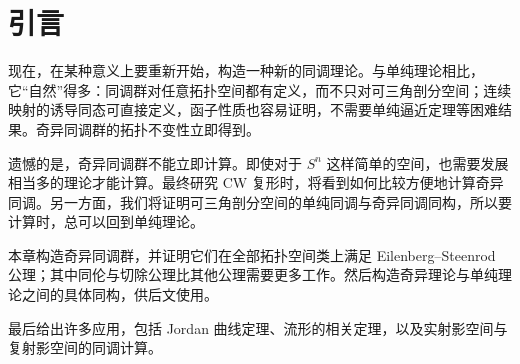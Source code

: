 \section{引言}
现在，在某种意义上要重新开始，构造一种新的同调理论。与单纯理论相比，它“自然”得多：同调群对任意拓扑空间都有定义，而不只对可三角剖分空间；连续映射的诱导同态可直接定义，函子性质也容易证明，不需要单纯逼近定理等困难结果。奇异同调群的拓扑不变性立即得到。

遗憾的是，奇异同调群不能立即计算。即使对于 $S^n$ 这样简单的空间，也需要发展相当多的理论才能计算。最终研究 CW 复形时，将看到如何比较方便地计算奇异同调。另一方面，我们将证明可三角剖分空间的单纯同调与奇异同调同构，所以要计算时，总可以回到单纯理论。

本章构造奇异同调群，并证明它们在全部拓扑空间类上满足 Eilenberg--Steenrod 公理；其中同伦与切除公理比其他公理需要更多工作。然后构造奇异理论与单纯理论之间的具体同构，供后文使用。

最后给出许多应用，包括 Jordan 曲线定理、流形的相关定理，以及实射影空间与复射影空间的同调计算。
